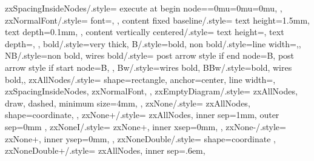 {{    %
    zxSpacingInsideNodes/.style={
      execute at begin node={\thinmuskip=0mu\medmuskip=0mu\thickmuskip=0mu}, %
    },
    zxNormalFont/.style={
      font={\fontsize{10}{12}\selectfont},
    },
    content fixed baseline/.style={
      text height=1.5mm,%
      text depth=0.1mm,%
    },
    content vertically centered/.style={
      text height=,
      text depth=,
    },
    bold/.style={very thick},
    B/.style={bold},
    non bold/.style={line width=\zxDefaultLineWidth,},
    NB/.style={non bold},
    wires bold/.style={
      post arrow style if end node={B},
      post arrow style if start node={B},
    },
    Bw/.style={wires bold},
    BBw/.style={bold, wires bold,},
    zxAllNodes/.style={
      shape=rectangle, %
      anchor=center, %
      line width=\zxDefaultLineWidth,
      zxSpacingInsideNodes,
      zxNormalFont,
    },
    zxEmptyDiagram/.style={
      zxAllNodes,
      draw,
      dashed,
      minimum size=4mm,
    },
    zxNone/.style={
      zxAllNodes,
      shape=coordinate, %
    },
    zxNone+/.style={
      zxAllNodes,
      inner sep=1mm,
      outer sep=0mm
    },
    zxNoneI/.style={
      zxNone+,
      inner xsep=0mm,
    },
    zxNone-/.style={
      zxNone+,
      inner ysep=0mm,
    },
    zxNoneDouble/.style={
      shape=coordinate
    },
    zxNoneDouble+/.style={
      zxAllNodes,
      inner sep=.6em,
}}}
